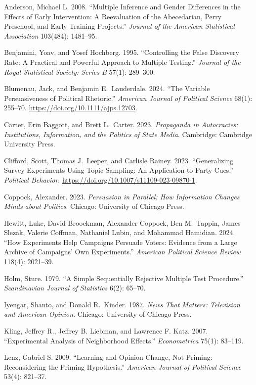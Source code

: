 \documentclass[11pt]{article}
\begin{document}
\begin{description}\setlength\itemsep{2pt}\small
\item Anderson, Michael L. 2008. ``Multiple Inference and Gender Differences in the Effects of Early Intervention: A Reevaluation of the Abecedarian, Perry Preschool, and Early Training Projects.'' \emph{Journal of the American Statistical Association} 103(484): 1481--95.
\item Benjamini, Yoav, and Yosef Hochberg. 1995. ``Controlling the False Discovery Rate: A Practical and Powerful Approach to Multiple Testing.'' \emph{Journal of the Royal Statistical Society: Series B} 57(1): 289--300.
\item Blumenau, Jack, and Benjamin E.\ Lauderdale. 2024. ``The Variable Persuasiveness of Political Rhetoric.'' \emph{American Journal of Political Science} 68(1): 255--70. \url{https://doi.org/10.1111/ajps.12703}.
\item Carter, Erin Baggott, and Brett L.\ Carter. 2023. \emph{Propaganda in Autocracies: Institutions, Information, and the Politics of State Media}. Cambridge: Cambridge University Press.
\item Clifford, Scott, Thomas J.\ Leeper, and Carlisle Rainey. 2023. ``Generalizing Survey Experiments Using Topic Sampling: An Application to Party Cues.'' \emph{Political Behavior}. \url{https://doi.org/10.1007/s11109-023-09870-1}.
\item Coppock, Alexander. 2023. \emph{Persuasion in Parallel: How Information Changes Minds about Politics}. Chicago: University of Chicago Press.
\item Hewitt, Luke, David Broockman, Alexander Coppock, Ben M.\ Tappin, James Slezak, Valerie Coffman, Nathaniel Lubin, and Mohammad Hamidian. 2024. ``How Experiments Help Campaigns Persuade Voters: Evidence from a Large Archive of Campaigns' Own Experiments.'' \emph{American Political Science Review} 118(4): 2021--39.
\item Holm, Sture. 1979. ``A Simple Sequentially Rejective Multiple Test Procedure.'' \emph{Scandinavian Journal of Statistics} 6(2): 65--70.
\item Iyengar, Shanto, and Donald R.\ Kinder. 1987. \emph{News That Matters: Television and American Opinion}. Chicago: University of Chicago Press.
\item Kling, Jeffrey R., Jeffrey B. Liebman, and Lawrence F. Katz. 2007. ``Experimental Analysis of Neighborhood Effects.'' \emph{Econometrica} 75(1): 83--119.
\item Lenz, Gabriel S. 2009. ``Learning and Opinion Change, Not Priming: Reconsidering the Priming Hypothesis.'' \emph{American Journal of Political Science} 53(4): 821--37.

\end{description}
\end{document}
